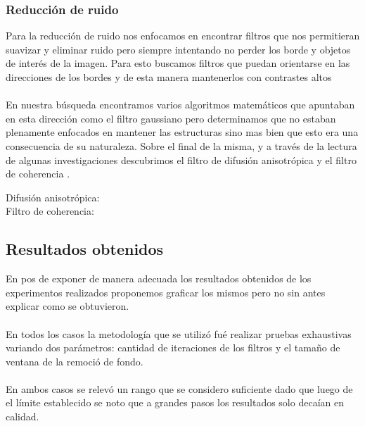 \subsubsection{Reducci\'on de ruido}

Para la reducci\'on de ruido nos enfocamos en encontrar filtros que nos permitieran suavizar y eliminar ruido pero siempre intentando no perder los borde y objetos de inter\'es de la imagen. Para esto buscamos filtros que puedan orientarse en las direcciones de los bordes y de esta manera mantenerlos con contrastes altos\\
\\En nuestra b\'usqueda encontramos varios algoritmos matem\'aticos que apuntaban en esta direcci\'on como el filtro gaussiano pero determinamos que no estaban plenamente enfocados en mantener las estructuras sino mas bien que esto era una consecuencia de su naturaleza. Sobre el final de la misma, y a trav\'es de la lectura de algunas investigaciones descubrimos el filtro de difusi\'on anisotr\'opica \cite{perona1990scale} y el filtro de coherencia \cite{weickert1999coherence}.

\begin{description}
  \item[Difusi\'on anisotr\'opica:]
  \item[Filtro de coherencia:]
\end{description}

\subsection{Resultados obtenidos}

En pos de exponer de manera adecuada los resultados obtenidos de los experimentos realizados proponemos graficar los mismos pero no sin antes explicar como se obtuvieron.\\
\\En todos los casos la metodolog\'ia que se utiliz\'o fu\'e realizar pruebas exhaustivas variando dos par\'ametros: cantidad de iteraciones de los filtros y el tamaño de ventana de la remoci\'o de fondo.\\
\\En ambos casos se relev\'o un rango que se considero suficiente dado que luego de el límite establecido se noto que a grandes pasos los resultados solo deca\'ian en calidad.\\

